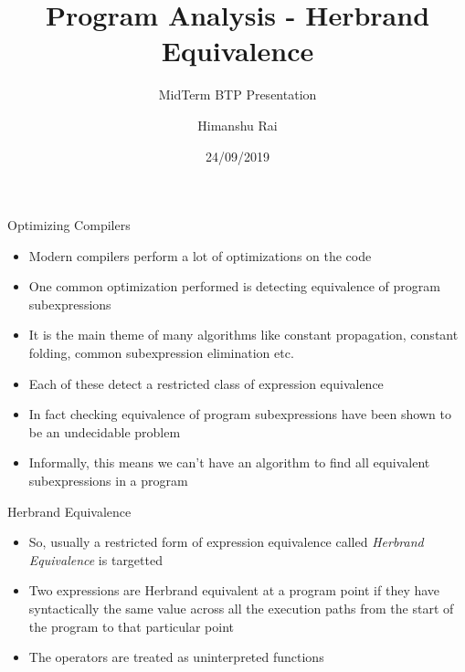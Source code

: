 \documentclass[11pt]{beamer}
\title{Program Analysis - Herbrand Equivalence}
\subtitle{MidTerm BTP Presentation}
\author{Himanshu Rai}
\institute{Indian Institute of Technology, Palakkad}
\date{24/09/2019}
\begin{document}
\begin{frame}
\titlepage
\end{frame}

\begin{frame}{Optimizing Compilers}
    \begin{itemize}
        \item Modern compilers perform a lot of optimizations on the code
        \item One common optimization performed is detecting equivalence of program subexpressions
        \item It is the main theme of many algorithms like constant propagation, constant folding, common subexpression elimination etc.
        \item Each of these detect a restricted class of expression equivalence
        \item In fact checking equivalence of program subexpressions have been shown to be an undecidable problem
        \item Informally, this means we can't have an algorithm to find all equivalent subexpressions in a program
    \end{itemize}
\end{frame}

\begin{frame}{Herbrand Equivalence}
    \begin{itemize}
        \item So, usually a restricted form of expression equivalence called \textit{Herbrand Equivalence} is targetted
        \item Two expressions are Herbrand equivalent at a program point if they have syntactically the same value across all the execution paths from the start of the program to that particular point
        \item The operators are treated as uninterpreted functions
    \end{itemize}
\end{frame}

\end{document}
